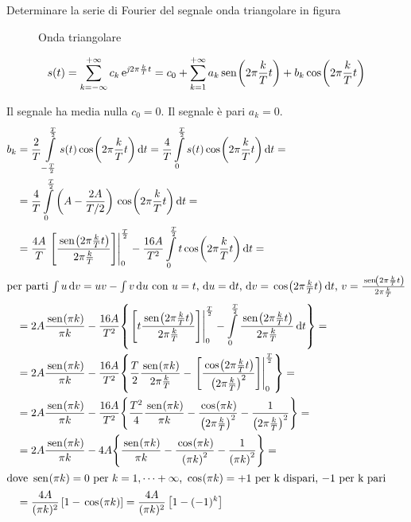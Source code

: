 \begin{esercizio}
Determinare la serie di Fourier del segnale onda triangolare in figura
\begin{figure}[h!]
\begin{center}
\end{center}
\caption{Onda triangolare}\label{fig:onda_triangolare}
\end{figure}

\[s(t)=\sum_{k=-\infty}^{+\infty}{c_k \operatorname{e}^{\operatorname{\mathit{j}\!} 2\pi\frac{k}{T}t}} =c_0+\sum_{k=1}^{+\infty}{a_k\,{\operatorname{sen}}^{}\!\left({2\pi\frac{k}{T}t}\right)+b_k\,{\operatorname{cos}}^{}\!\left({2\pi\frac{k}{T}t}\right)}\]

Il segnale ha media nulla $c_0=0$. Il segnale è pari $a_k=0$. 
\[\begin{split}b_k&=\frac{2}{T}\intd{-\frac{T}{2}}{\frac{T}{2}}{s(t)\cos{2\pi\frac{k}{T}t}}{t}=\frac{4}{T}\intd{0}{\frac{T}{2}}{s(t)\cos{2\pi\frac{k}{T}t}}{t}=\\
&=\frac{4}{T}\intd{0}{\frac{T}{2}}{\left(A-\frac{2 A}{T/2}\right)\cos{2\pi\frac{k}{T}t}}{t}=\\
&=\frac{4A}{T}\bound{0}{\frac{T}{2}}{\frac{\sen{2\pi\frac{k}{T}t}}{2\pi\frac{k}{T}}} -\frac{16A}{T^2}\intd{0}{\frac{T}{2}}{t\cos{2\pi\frac{k}{T}t}}{t}=\\
\intertext{per parti $\int u\diff v= u v-\int v\diff u$ con $u=t$, $\diff u=\diff t$, $\diff v=\cos{2\pi\frac{k}{T}t}\diff t$, $v=\frac{\sen{2\pi\frac{k}{T}t}}{2\pi\frac{k}{T}}$}
&=2A \frac{\sen{\pi k}}{\pi k}-\frac{16A}{T^2}{\left\lbrace \bound{0}{\frac{T}{2}}{t\frac{\sen{2\pi\frac{k}{T}t}}{2\pi\frac{k}{T}}}-\intd{0}{\frac{T}{2}}{\frac{\sen{2\pi\frac{k}{T}t}}{2\pi\frac{k}{T}}}{t}\right\rbrace}=\\
&=2A \frac{\sen{\pi k}}{\pi k}-\frac{16A}{T^2}{\left\lbrace\frac{T}{2}\frac{\sen{\pi k}}{2\pi\frac{k}{T}}-\bound{0}{\frac{T}{2}}{\frac{\cos{2\pi\frac{k}{T}t}}{\left(2\pi\frac{k}{T}\right)^2}}\right\rbrace}=\\
&=2A \frac{\sen{\pi k}}{\pi k}-\frac{16A}{T^2}{\left\lbrace\frac{T^2}{4}\frac{\sen{\pi k}}{\pi k}-\frac{\cos{\pi k}}{\left(2\pi\frac{k}{T}\right)^2}-\frac{1}{\left(2\pi\frac{k}{T}\right)^2}\right\rbrace}=\\
&=2A \frac{\sen{\pi k}}{\pi k}-4A{\left\lbrace\frac{\sen{\pi k}}{\pi k}-\frac{\cos{\pi k}}{\left(\pi k\right)^2}-\frac{1}{\left(\pi k\right)^2}\right\rbrace}=\\
\intertext{dove $\sen{\pi k}=0$ per $k=1,\dots+\infty$, $\cos{\pi k}=+1$ per k dispari, $-1$ per k pari}
&=\frac{4A}{(\pi k)^2}\left[1-\cos{\pi k}\right] = \frac{4A}{(\pi k)^2}\left[1-(-1)^k\right]
\end{split}\]
\end{esercizio}


